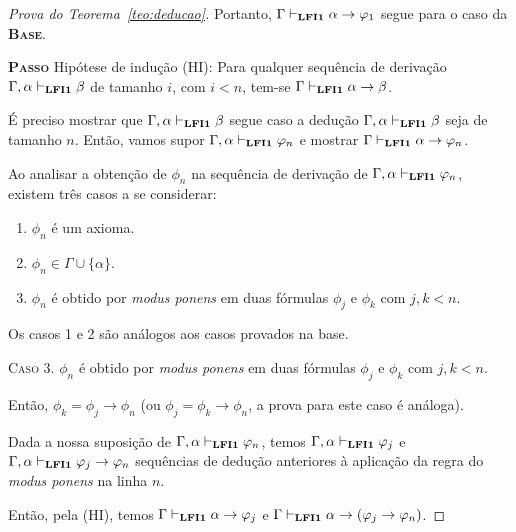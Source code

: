 \begin{proof}[Prova do Teorema~\ref{teo:deducao}]
            Portanto, $\Gamma \vdash_{\textbf{LFI1}{}} \alpha \to \varphi_{1}$ segue para o caso da \textbf{\textsc{Base}}.

        \noindent \textbf{\textsc{Passo}} Hipótese de indução (HI): Para qualquer sequência de derivação $\Gamma, \alpha \vdash_{\textbf{LFI1}{}} \beta$ de tamanho $i$, com $i < n$, tem-se $\Gamma \vdash_{\textbf{LFI1}{}} \alpha \to \beta$. 
    
        É preciso mostrar que $\Gamma, \alpha \vdash_{\textbf{LFI1}{}} \beta$ segue caso a dedução $\Gamma, \alpha \vdash_{\textbf{LFI1}{}} \beta$ seja de tamanho $n$. Então, vamos supor $\Gamma, \alpha \vdash_{\textbf{LFI1}{}} \varphi_{n}$ e mostrar $\Gamma \vdash_{\textbf{LFI1}{}} \alpha \to \varphi_{n}$.
        
        Ao analisar a obtenção de $\phi_{n}$ na sequência de derivação de $\Gamma, \alpha\vdash_{\textbf{LFI1}{}} \varphi_{n}$, existem três casos a se considerar:
        \begin{enumerate}
            \item $\phi_{n}$ é um axioma.
            \item $\phi_{n} \in \Gamma \cup \{\alpha\}$.
            \item $\phi_{n}$ é obtido por \textit{modus ponens} em duas fórmulas $\phi_{j}$ e $\phi_{k}$ com $j, k < n$.
        \end{enumerate}
        
         Os casos 1 e 2 são análogos aos casos provados na base.

         \noindent \textsc{Caso 3.} $\phi_{n}$ é obtido por \textit{modus ponens} em duas fórmulas $\phi_{j}$ e $\phi_{k}$ com $j, k < n$. 
         
         Então, $\phi_{k} = \phi_{j} \to \phi_{n}$ (ou $\phi_{j} = \phi_{k} \to \phi_{n}$, a prova para este caso é análoga). 
         
         Dada a nossa suposição de $\Gamma, \alpha \vdash_{\textbf{LFI1}{}} \varphi_{n}$, temos $\Gamma, \alpha \vdash_{\textbf{LFI1}{}} \varphi_{j}$ e $\Gamma, \alpha \vdash_{\textbf{LFI1}{}} \varphi_{j} \to \varphi_{n}$ sequências de dedução anteriores à aplicação da regra do \textit{modus ponens} na linha $n$. 
         
         Então, pela (HI), temos $\Gamma \vdash_{\textbf{LFI1}{}} \alpha \to \varphi_{j}$ e $\Gamma \vdash_{\textbf{LFI1}{}} \alpha \to (\varphi_{j} \to \varphi_{n})$. 
         

\end{proof}

